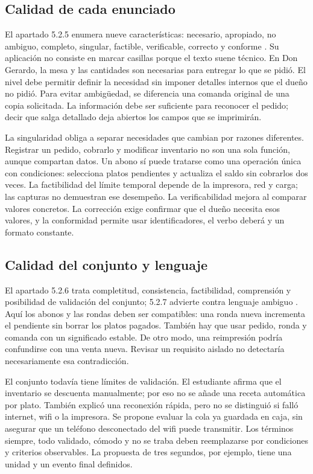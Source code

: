 \documentclass[11pt,a4paper]{article}
\begin{document}
\subsection{Calidad de cada enunciado}
El apartado 5.2.5 enumera nueve características: necesario, apropiado, no ambiguo, completo, singular, factible, verificable, correcto y conforme \cite{iso29148}. Su aplicación no consiste en marcar casillas porque el texto suene técnico. En Don Gerardo, la mesa y las cantidades son necesarias para entregar lo que se pidió. El nivel debe permitir definir la necesidad sin imponer detalles internos que el dueño no pidió. Para evitar ambigüedad, se diferencia una comanda original de una copia solicitada. La información debe ser suficiente para reconocer el pedido; decir que salga detallado deja abiertos los campos que se imprimirán.

La singularidad obliga a separar necesidades que cambian por razones diferentes. Registrar un pedido, cobrarlo y modificar inventario no son una sola función, aunque compartan datos. Un abono sí puede tratarse como una operación única con condiciones: selecciona platos pendientes y actualiza el saldo sin cobrarlos dos veces. La factibilidad del límite temporal depende de la impresora, red y carga; las capturas no demuestran ese desempeño. La verificabilidad mejora al comparar valores concretos. La corrección exige confirmar que el dueño necesita esos valores, y la conformidad permite usar identificadores, el verbo deberá y un formato constante.

\subsection{Calidad del conjunto y lenguaje}
El apartado 5.2.6 trata completitud, consistencia, factibilidad, comprensión y posibilidad de validación del conjunto; 5.2.7 advierte contra lenguaje ambiguo \cite{iso29148}. Aquí los abonos y las rondas deben ser compatibles: una ronda nueva incrementa el pendiente sin borrar los platos pagados. También hay que usar pedido, ronda y comanda con un significado estable. De otro modo, una reimpresión podría confundirse con una venta nueva. Revisar un requisito aislado no detectaría necesariamente esa contradicción.

El conjunto todavía tiene límites de validación. El estudiante afirma que el inventario se descuenta manualmente; por eso no se añade una receta automática por plato. También explicó una reconexión rápida, pero no se distinguió si falló internet, wifi o la impresora. Se propone evaluar la cola ya guardada en caja, sin asegurar que un teléfono desconectado del wifi puede transmitir. Los términos siempre, todo validado, cómodo y no se traba deben reemplazarse por condiciones y criterios observables. La propuesta de tres segundos, por ejemplo, tiene una unidad y un evento final definidos.
\end{document}
